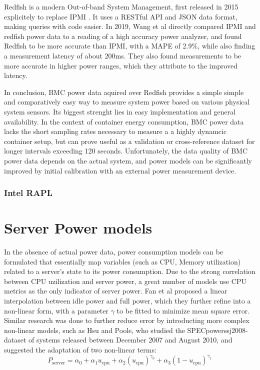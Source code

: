 Redfish is a modern Out-of-band System Management, first released in 2015 explicitely to replace IPMI \parencite{thomas-krenn-redfish}. It uses a RESTful API and JSON data format, making queries with code easier. In 2019, Wang et al\parencite{wang2019empirical} directly compared IPMI and redfish power data to a reading of a high accuracy power analyzer, and found Redfish to be more accurate than IPMI, with a MAPE of 2.9\%, while also finding a measurement latency of about 200ms. They also found measurements to be more accurate in higher power ranges, which they attribute to the improved latency.

In conclusion, BMC power data aquired over Redfish provides a simple simple and comparatively easy way to measure system power based on various physical system sensors. Its biggest strenght lies in easy implementation and general availability. In the context of container energy consumption, BMC power data lacks the short sampling rates necessary to measure a a highly dynamcic container setup, but can prove useful as a validation or cross-reference dataset for longer intervals exceeding 120 seconds. Unfortunately, the data quality of BMC power data depends on the actual system, and  power models can be significantly improved by initial calibration with an external power measurement device\parencite{kavanagh2016accuracy}.

\subsubsection{Intel RAPL}


\section{Server Power models}
In the absence of actual power data, power consumption models can be formulated that essentially map variables (such as CPU, Memory utilization) related to a server's state to its power consumption. 
Due to the strong correlation between CPU uzilization and server power, a great number of models use CPU metrics as the only indicator of server power. Fan et al\parencite{fan2007power} proposed a linear interpolation between idle power and full power, which they further refine into a non-linear form, with a parameter $\gamma$ to be fitted to minimize mean square error. Similar research was done to further reduce error by introducting more complex non-linear models, such as Hsu and Poole\parencite{hsu2011power}, who studied the SPECpower\textunderscore ssj2008-dataset of systems released between December 2007 and August 2010, and suggested the adaptation of two non-linear terms:
\begin{equation}
    P_{\text{server}} = \alpha_0 + \alpha_1 u_{\text{cpu}} + \alpha_2 \left( u_{\text{cpu}} \right)^{\gamma_0} + \alpha_3 \left( 1 - u_{\text{cpu}} \right)^{\gamma_1}
\end{equation}

